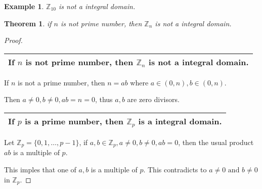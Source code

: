 \documentclass{article}
\theoremstyle{MyNonumberplain}
\theoremstyle{break}
\newtheorem*{proof}{Proof. }
\newcommand{\infixand}{\text{ and }}
\theoremstyle{break}
\newtheorem{theorem}{Theorem}[section]
\newtheorem{example}{Example}[section]
\theoremstyle{break}
\theoremstyle{definition}
\theoremstyle{break}
\begin{document}
\begin{expbox}
    \begin{example}
        $\mathbb{Z}_{10}$ is not a integral domain.
    \end{example}
\end{expbox}

\begin{thmbox}
    \begin{theorem}
        if $n$ is not prime number, then $\mathbb{Z}_n$ is not a integral domain.
    \end{theorem}
    \begin{prfbox}
        \begin{proof}
            \begin{tabular}{|c|}
                \hline
                If $n$ is not prime number, then $\mathbb{Z}_n$ is not a integral domain.\\
                \hline
              \end{tabular}\bigskip
              
              If $n$ is not a prime number, then $n = a b$ where $a \in (0, n), b \in (0,
              n)$.\bigskip
              
              Then $a \neq 0, b \neq 0, a b = n = 0$, thus $a, b$ are zero divisors.\bigskip
              
              \begin{tabular}{|c|}
                \hline
                If $p$ is a prime number, then $\mathbb{Z}_p$ is a integral domain.\\
                \hline
              \end{tabular}\bigskip
              
              Let $\mathbb{Z}_p = \{ 0, 1, \ldots, p - 1 \}$, if $a, b \in \mathbb{Z}_p, a
              \neq 0, b \neq 0, a b = 0$, then the usual product $a b$ is a multiple of $p$.\bigskip
              
              This imples that one of $a, b$ is a multiple of $p$. This contradicts to $a
              \neq 0 \infixand b \neq 0$ in $\mathbb{Z}_p$.
        \end{proof}
    \end{prfbox}
\end{thmbox}
\end{document}
